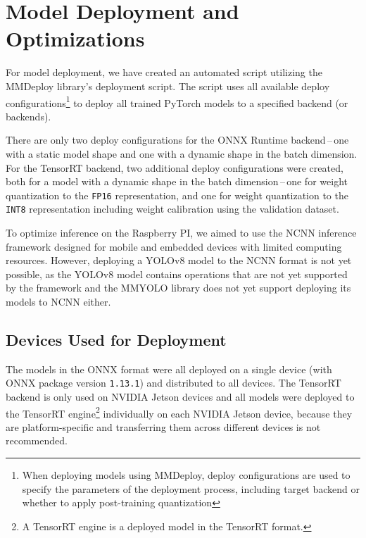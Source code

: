 \section{Model Deployment and Optimizations}

For model deployment, we have created an automated script utilizing the MMDeploy
library's deployment script. The script uses all available deploy
configurations\footnote{When deploying models using MMDeploy, deploy
configurations are used to specify the parameters of the deployment process,
including target backend or whether to apply post-training quantization} to
deploy all trained PyTorch models to a specified backend (or backends).

There are only two deploy configurations for the ONNX Runtime backend\,--\,one
with a static model shape and one with a
dynamic shape in the batch dimension. For the TensorRT backend,
two additional deploy configurations were created, both for a model with a
dynamic shape in the batch dimension\,--\,one for weight quantization to the
\texttt{FP16} representation, and one for weight quantization to the
\texttt{INT8} representation including weight calibration using the validation
dataset.

To optimize inference on the Raspberry PI, we aimed to use the NCNN inference
framework designed for mobile and embedded devices with limited computing
resources. However, deploying a YOLOv8 model to the NCNN format is not yet
possible, as the YOLOv8 model contains operations that are not yet supported by
the framework and the MMYOLO library does not yet support deploying its models
to NCNN either.


\subsection*{Devices Used for Deployment}

The models in the ONNX format were all deployed on a single device (with ONNX
package version \texttt{1.13.1}) and distributed to all devices. The TensorRT
backend is only used on NVIDIA Jetson devices and all models were deployed to
the TensorRT engine\footnote{A TensorRT engine is a deployed model in the
TensorRT format.} individually on each NVIDIA Jetson device, because they are
platform-specific and transferring them across different devices is not
recommended.

